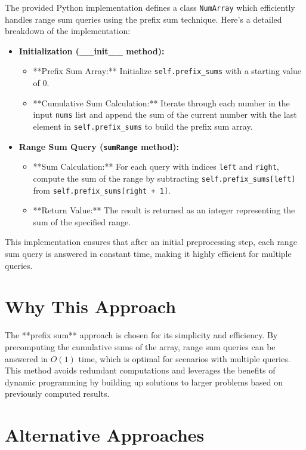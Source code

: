 The provided Python implementation defines a class \texttt{NumArray} which efficiently handles range sum queries using the prefix sum technique. Here's a detailed breakdown of the implementation:

\begin{itemize}
    \item \textbf{Initialization (\_\_init\_\_ method):}
    \begin{itemize}
        \item **Prefix Sum Array:** Initialize \texttt{self.prefix\_sums} with a starting value of \(0\).
        \item **Cumulative Sum Calculation:** Iterate through each number in the input \texttt{nums} list and append the sum of the current number with the last element in \texttt{self.prefix\_sums} to build the prefix sum array.
    \end{itemize}
    
    \item \textbf{Range Sum Query (\texttt{sumRange} method):}
    \begin{itemize}
        \item **Sum Calculation:** For each query with indices \texttt{left} and \texttt{right}, compute the sum of the range by subtracting \texttt{self.prefix\_sums[left]} from \texttt{self.prefix\_sums[right + 1]}.
        \item **Return Value:** The result is returned as an integer representing the sum of the specified range.
    \end{itemize}
\end{itemize}

This implementation ensures that after an initial preprocessing step, each range sum query is answered in constant time, making it highly efficient for multiple queries.

\section*{Why This Approach}

The **prefix sum** approach is chosen for its simplicity and efficiency. By precomputing the cumulative sums of the array, range sum queries can be answered in \( O(1) \) time, which is optimal for scenarios with multiple queries. This method avoids redundant computations and leverages the benefits of dynamic programming by building up solutions to larger problems based on previously computed results.

\section*{Alternative Approaches}

